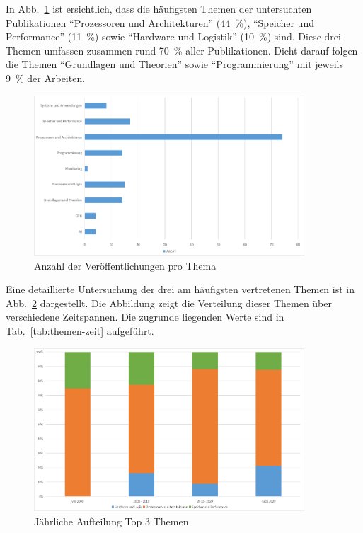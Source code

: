 In Abb.~\ref{fig:3-anzahl-themen} ist ersichtlich, dass die häufigsten Themen der untersuchten Publikationen \enquote{Prozessoren und Architekturen} (44~\%), \enquote{Speicher und Performance} (11~\%) sowie \enquote{Hardware und Logistik} (10~\%) sind. Diese drei Themen umfassen zusammen rund 70~\% aller Publikationen. Dicht darauf folgen die Themen \enquote{Grundlagen und Theorien} sowie \enquote{Programmierung} mit jeweils 9~\% der Arbeiten.


\begin{figure}[!htbp]
    \centering
    \includegraphics[width=0.90\textwidth]{graphics/3-anzahl-themen.png}
    \caption{Anzahl der Veröffentlichungen pro Thema}
    \label{fig:3-anzahl-themen}
\end{figure}

Eine detaillierte Untersuchung der drei am häufigsten vertretenen Themen ist in Abb.~\ref{fig:4-top3-themen} dargestellt. Die Abbildung zeigt die Verteilung dieser Themen über verschiedene Zeitspannen. Die zugrunde liegenden Werte sind in Tab.~\ref{tab:themen-zeit} aufgeführt.
 
\begin{figure}[!htbp]
    \centering
    \includegraphics[width=0.90\textwidth]{graphics/4-top3-themen-jahr.png}
    \caption{Jährliche Aufteilung Top 3 Themen}
    \label{fig:4-top3-themen}
\end{figure}

